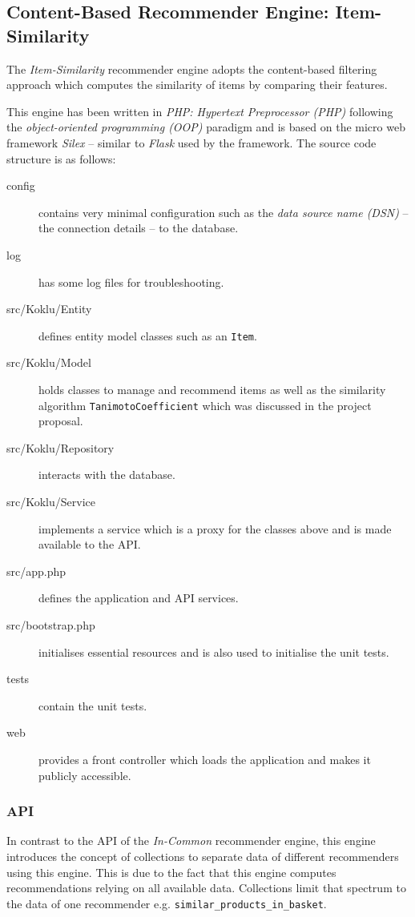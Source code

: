 \subsection{Content-Based Recommender Engine: Item-Similarity}

The \emph{Item-Similarity} recommender engine adopts the content-based filtering approach which computes the similarity of items by comparing their features.

This engine has been written in \emph{PHP: Hypertext Preprocessor (PHP)} following the \emph{object-oriented programming (OOP)} paradigm and is based on the micro web framework \emph{Silex} -- similar to \emph{Flask} used by the framework. The source code structure is as follows:

\begin{description}
    \item[config] contains very minimal configuration such as the \emph{data source name (DSN)} -- the connection details -- to the database.
    \item[log] has some log files for troubleshooting.
    \item[src/Koklu/Entity] defines entity model classes such as an \texttt{Item}.
    \item[src/Koklu/Model] holds classes to manage and recommend items as well as the similarity algorithm \texttt{TanimotoCoefficient} which was discussed in the project proposal.
    \item[src/Koklu/Repository] interacts with the database.
    \item[src/Koklu/Service] implements a service which is a proxy for the classes above and is made available to the API.
    \item[src/app.php] defines the application and API services.
    \item[src/bootstrap.php] initialises essential resources and is also used to initialise the unit tests.
    \item[tests] contain the unit tests.
    \item[web] provides a front controller which loads the application and makes it publicly accessible.
\end{description}

\subsubsection{API}

In contrast to the API of the \emph{In-Common} recommender engine, this engine introduces the concept of collections to separate data of different recommenders using this engine. This is due to the fact that this engine computes recommendations relying on all available data. Collections limit that spectrum to the data of one recommender e.g. \texttt{similar_products_in_basket}.

